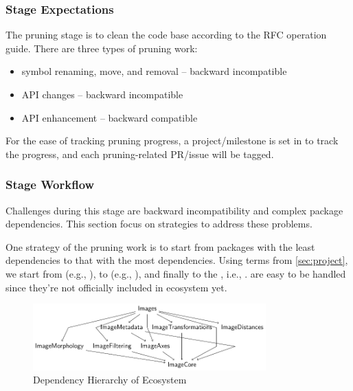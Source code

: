 \subsubsection*{Stage Expectations}

The pruning stage is to clean the code base according to the RFC operation guide. There are three types of pruning work:
{\small
\begin{itemize}
    \item symbol renaming, move, and removal -- backward incompatible
    \item API changes -- backward incompatible
    \item API enhancement -- backward compatible
\end{itemize}
\normalsize
For the ease of tracking pruning progress, a project/milestone is set in \repoimages{} to track the progress, and each pruning-related PR/issue will be tagged. \par}

\subsubsection*{Stage Workflow}

Challenges during this stage are backward incompatibility and complex package dependencies. This section focus on strategies to address these problems. \par

One strategy of the pruning work is to start from packages with the least dependencies to that with the most dependencies. Using terms from \cref{sec:project}, we start from  (e.g., \repoimagecore{}), to  (e.g., \repoimagetransformations{}), and finally to the , i.e., \repoimages{}.  are easy to be handled since they're not officially included in \images{} ecosystem yet. \par

\begin{figure}[htbp]
\caption{Dependency Hierarchy of \images{} Ecosystem}
  \centering
  \includegraphics[width=0.8\textwidth]{figures/images_dep.pdf}
\end{figure}

